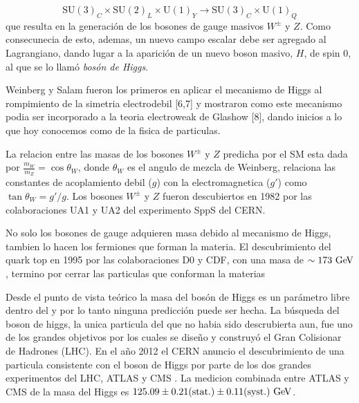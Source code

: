 \begin{equation}
  \text{SU}(3)_C \times \text{SU}(2)_L \times \text{U}(1)_Y \to \text{SU}(3)_C \times \text{U}(1)_Q
\end{equation}
%
que resulta en la generación de los bosones de gauge masivos $W^\pm$ y $Z$. Como
consecunecia de esto, ademas, un nuevo campo escalar debe ser agregado al
Lagrangiano, dando lugar a la aparici\'on de un nuevo boson masivo, $H$, de spin
0, al que se lo llam\'o \emph{bos\'on de Higgs}.

Weinberg y Salam fueron los primeros en aplicar el mecanismo de Higgs al
rompimiento de la simetria electrodebil [6,7] y mostraron como este mecanismo
podia ser incorporado a la teoria electroweak de Glashow [8], dando inicios a lo
que hoy conocemos como {\SM} de la fisica de particulas.

La relacion entre las masas de los bosones $W^\pm$ y $Z$ predicha por el SM esta
dada por $\frac{m_W}{m_Z} = \cos \theta_W$, donde $\theta_W$ es el angulo de
mezcla de Weinberg, relaciona las constantes de acoplamiento debil ($g$) con la
electromagnetica ($g'$) como $\tan\theta_W = g'/g$. Los bosones $W^\pm$ y $Z$
fueron descubiertos en 1982 por las colaboraciones UA1 y UA2 del experimento
SppS del CERN.

No solo los bosones de gauge adquieren masa debido al mecanismo de Higgs,
tambien lo hacen los fermiones que forman la materia. El descubrimiento del
quark top en 1995 por las colaboraciones D0 y CDF, con una masa de $\sim 173
\GeV$, termino por cerrar las particulas que conforman la materias


Desde el punto de vista teórico la masa del bosón de Higgs es un parámetro libre
dentro del {\SM} y por lo tanto ninguna predicción puede ser hecha. La búsqueda
del boson de higgs, la unica particula del {\SM} que no habia sido descrubierta
aun, fue uno de los grandes objetivos por los cuales se dise\~no y construyó el
Gran Colisionar de Hadrones (LHC). En el a\~no 2012 el CERN anuncio el
descubrimiento de una particula consistente con el boson de Higgs por parte de
los dos grandes experimentos del LHC, ATLAS y CMS
\cite{Aad:2012tfa,Chatrchyan:2012ufa}. La medicion combinada entre ATLAS y CMS
de la masa del Higgs es $125.09 \pm 0.21 \text{(stat.)} \pm 0.11 \text{(syst.)}
\gev$.

